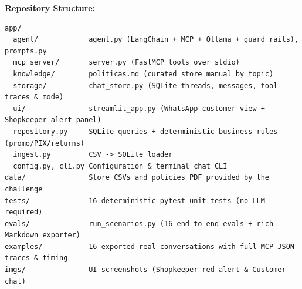 \documentclass[11pt,a4paper]{article}
\begin{document}
\textbf{Repository Structure:}
\begin{lstlisting}
app/
  agent/            agent.py (LangChain + MCP + Ollama + guard rails), prompts.py
  mcp_server/       server.py (FastMCP tools over stdio)
  knowledge/        politicas.md (curated store manual by topic)
  storage/          chat_store.py (SQLite threads, messages, tool traces & mode)
  ui/               streamlit_app.py (WhatsApp customer view + Shopkeeper alert panel)
  repository.py     SQLite queries + deterministic business rules (promo/PIX/returns)
  ingest.py         CSV -> SQLite loader
  config.py, cli.py Configuration & terminal chat CLI
data/               Store CSVs and policies PDF provided by the challenge
tests/              16 deterministic pytest unit tests (no LLM required)
evals/              run_scenarios.py (16 end-to-end evals + rich Markdown exporter)
examples/           16 exported real conversations with full MCP JSON traces & timing
imgs/               UI screenshots (Shopkeeper red alert & Customer chat)
\end{lstlisting}
\end{document}
